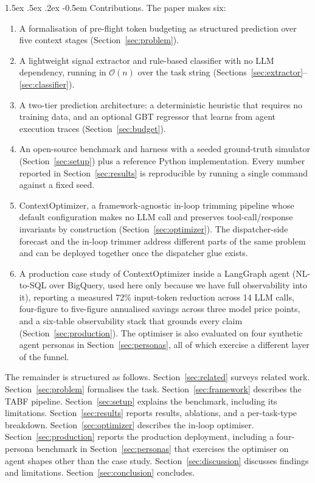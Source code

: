 \documentclass{article}
\makeatletter
\renewcommand\paragraph{%
  \@startsection{paragraph}{4}{\z@}%
    {1.5ex \@plus.5ex \@minus.2ex}%
    {-0.5em}%
    {\normalfont\normalsize\bfseries}%
}
\makeatother
\begin{document}
\paragraph{Contributions.} The paper makes six:

\begin{enumerate}
  \item A formalisation of pre-flight token budgeting as structured
        prediction over five context stages (Section~\ref{sec:problem}).
  \item A lightweight signal extractor and rule-based classifier with no
        LLM dependency, running in $\mathcal{O}(n)$ over the task string
        (Sections~\ref{sec:extractor}--\ref{sec:classifier}).
  \item A two-tier prediction architecture: a deterministic heuristic
        that requires no training data, and an optional GBT regressor that
        learns from agent execution traces (Section~\ref{sec:budget}).
  \item An open-source benchmark and harness with a seeded ground-truth
        simulator (Section~\ref{sec:setup}) plus a reference Python
        implementation. Every number reported in
        Section~\ref{sec:results} is reproducible by running a single
        command against a fixed seed.
  \item ContextOptimizer, a framework-agnostic in-loop trimming
        pipeline whose default configuration makes no LLM call and
        preserves tool-call/response invariants by construction
        (Section~\ref{sec:optimizer}). The dispatcher-side forecast and
        the in-loop trimmer address different parts of the same problem
        and can be deployed together once the dispatcher glue exists.
  \item A production case study of ContextOptimizer inside a LangGraph
        agent (NL-to-SQL over BigQuery, used here only because we have
        full observability into it), reporting a measured 72\%
        input-token reduction across 14 LLM calls, four-figure to
        five-figure annualised savings across three model price points,
        and a six-table observability stack that grounds every claim
        (Section~\ref{sec:production}). The optimiser is also
        evaluated on four synthetic agent personas in
        Section~\ref{sec:personas}, all of which exercise a different
        layer of the funnel.
\end{enumerate}

The remainder is structured as follows. Section~\ref{sec:related} surveys
related work. Section~\ref{sec:problem} formalises the task.
Section~\ref{sec:framework} describes the TABF pipeline.
Section~\ref{sec:setup} explains the benchmark, including its limitations.
Section~\ref{sec:results} reports results, ablations, and a per-task-type
breakdown. Section~\ref{sec:optimizer} describes the in-loop optimiser.
Section~\ref{sec:production} reports the production deployment, including
a four-persona benchmark in Section~\ref{sec:personas} that exercises the
optimiser on agent shapes other than the case study.
Section~\ref{sec:discussion} discusses findings and limitations.
Section~\ref{sec:conclusion} concludes.
\end{document}
